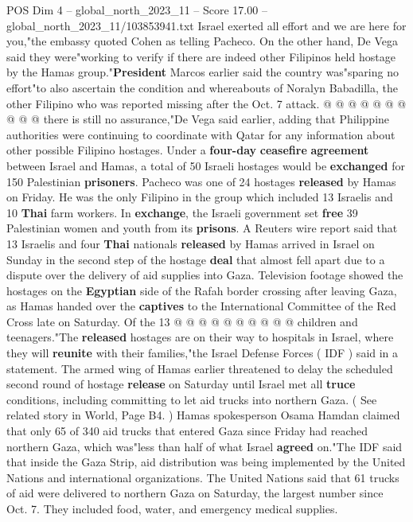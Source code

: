 \begin{textsample}{POS Dim 4 – global\_north\_2023\_11 – Score 17.00 – global\_north\_2023\_11/103853941.txt}
Israel exerted all effort and we are here for you,"the embassy quoted Cohen as telling Pacheco.
On the other hand, De Vega said they were"working to verify if there are indeed other Filipinos held hostage by the Hamas group."\textbf{President} Marcos earlier said the country was"sparing no effort"to also ascertain the condition and whereabouts of Noralyn Babadilla, the other Filipino who was reported missing after the Oct. 7 attack. @ @ @ @ @ @ @ @ @ @ there is still no assurance,"De Vega said earlier, adding that Philippine authorities were continuing to coordinate with Qatar for any information about other possible Filipino hostages.
Under a \textbf{four-day} \textbf{ceasefire} \textbf{agreement} between Israel and Hamas, a total of 50 Israeli hostages would be \textbf{exchanged} for 150 Palestinian \textbf{prisoners}.
Pacheco was one of 24 hostages \textbf{released} by Hamas on Friday.
He was the only Filipino in the group which included 13 Israelis and 10 \textbf{Thai} farm workers.
In \textbf{exchange}, the Israeli government set \textbf{free} 39 Palestinian women and youth from its \textbf{prisons}.
A Reuters wire report said that 13 Israelis and four \textbf{Thai} nationals \textbf{released} by Hamas arrived in Israel on Sunday in the second step of the hostage \textbf{deal} that almost fell apart due to a dispute over the delivery of aid supplies into Gaza.
Television footage showed the hostages on the \textbf{Egyptian} side of the Rafah border crossing after leaving Gaza, as Hamas handed over the \textbf{captives} to the International Committee of the Red Cross late on Saturday.
Of the 13 @ @ @ @ @ @ @ @ @ @ children and teenagers."The \textbf{released} hostages are on their way to hospitals in Israel, where they will \textbf{reunite} with their families,"the Israel Defense Forces ( IDF ) said in a statement.
The armed wing of Hamas earlier threatened to delay the scheduled second round of hostage \textbf{release} on Saturday until Israel met all \textbf{truce} conditions, including committing to let aid trucks into northern Gaza. ( See related story in World, Page B4. ) Hamas spokesperson Osama Hamdan claimed that only 65 of 340 aid trucks that entered Gaza since Friday had reached northern Gaza, which was"less than half of what Israel \textbf{agreed} on."The IDF said that inside the Gaza Strip, aid distribution was being implemented by the United Nations and international organizations.
The United Nations said that 61 trucks of aid were delivered to northern Gaza on Saturday, the largest number since Oct. 7.
They included food, water, and emergency medical supplies.

\end{textsample}
